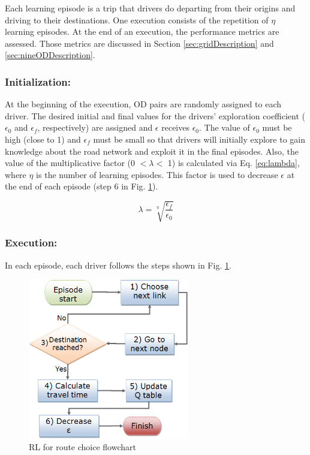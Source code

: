 \documentclass{RITA}
\newcommand{\numepis}{\ensuremath{\eta}}	%
\begin{document}
Each learning episode is a trip that drivers do departing from their origins and driving to their destinations. One execution consists of the repetition of $\numepis$ learning episodes. At the end of an execution, the performance metrics are assessed. Those metrics are discussed in Section \ref{sec:gridDescription} and \ref{sec:nineODDescription}.

\subsubsection{Initialization:}
At the beginning of the execution, OD pairs are randomly assigned to each driver. The desired initial and final values for the drivers' exploration coefficient ($\epsilon_0$ and $\epsilon_f$, respectively) are assigned and $\epsilon$ receives $\epsilon_0$. The value of $\epsilon_0$ must be high (close to 1) and $\epsilon_f$ must be small so that drivers will initially explore to gain knowledge about the road network and exploit it in the final episodes. Also, the value of the multiplicative factor (0 $< \lambda <$ 1) is calculated via Eq. \eqref{eq:lambda}, where $\numepis$ is the number of learning episodes. This factor is used to decrease $\epsilon$ at the end of each episode (step 6 in Fig. \ref{fig:flowchart}).

\begin{equation}
\label{eq:lambda}
\lambda = \sqrt[\numepis]{\frac{\epsilon_f}{\epsilon_0}}
\end{equation}

\subsubsection{Execution:}

In each episode, each driver follows the steps shown in Fig. \ref{fig:flowchart}.

\begin{figure}[ht]
    \centerline{\includegraphics[width=7cm]{img/flowchart3.png}}
    \caption{RL for route choice flowchart}
    \label{fig:flowchart}
\end{figure}
\end{document}
